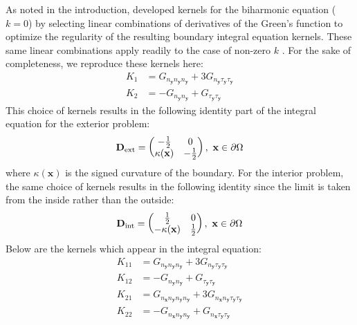 \documentclass[preprint,12pt,3p]{elsarticle}
\begin{document}
As noted in the introduction, \cite{farkas} developed kernels for the biharmonic equation ($k = 0$)
by selecting linear combinations of derivatives of the Green's function to optimize the regularity
of the resulting boundary integral equation kernels. These same linear combinations apply readily to
the case of non-zero $k$ \cite{Lindsay2018}. 
For the sake of completeness, we reproduce these kernels here:
\begin{align}
    K_1 &= G_{n_\mathbf{y} n_\mathbf{y} n_\mathbf{y}} + 3G_{n_\mathbf{y} \tau_\mathbf{y} \tau_\mathbf{y}} \\
    K_2 &= - G_{n_\mathbf{y} n_\mathbf{y}} + G_{\tau_\mathbf{y} \tau_\mathbf{y}}
\end{align}
This choice of kernels results in the following identity part of the integral equation for the exterior problem:
\begin{equation}
    \mathbf{D}_{\rm ext} = \begin{pmatrix}
       -\frac{1}{2} & 0 \\
        \kappa(\mathbf{x}) & -\frac{1}{2}
    \end{pmatrix} \label{clamped_id} , \ \mathbf{x}\in \partial \Omega
\end{equation}
where $\kappa(\mathbf{x})$ is the signed curvature of the boundary. For the interior problem, the same choice of kernels results in the following identity since the limit is taken from the inside rather than the outside: 
\begin{equation}
    \mathbf{D}_{\rm int} = \begin{pmatrix}
       \frac{1}{2} & 0 \\
        -\kappa(\mathbf{x}) & \frac{1}{2}
    \end{pmatrix}  , \ \mathbf{x}\in \partial \Omega
\end{equation}    
Below are the kernels which appear in the integral equation:
\begin{align}
    K_{11} &= G_{n_\mathbf{y} n_\mathbf{y} n_\mathbf{y}} + 3G_{n_\mathbf{y} \tau_\mathbf{y} \tau_\mathbf{y}} \label{first_clamped_ker} \\
    K_{12} &= - G_{n_\mathbf{y} n_\mathbf{y}} + G_{\tau_\mathbf{y} \tau_\mathbf{y}} \\
    K_{21} &= G_{n_\mathbf{x} n_\mathbf{y} n_\mathbf{y} n_\mathbf{y}} + 3G_{n_\mathbf{x} n_\mathbf{y} \tau_\mathbf{y} \tau_\mathbf{y}} \\
    K_{22} &= - G_{n_\mathbf{x} n_\mathbf{y} n_\mathbf{y}} + G_{n_\mathbf{x} \tau_\mathbf{y} \tau_\mathbf{y}} \label{last_clamped_ker}
\end{align}
\end{document}

